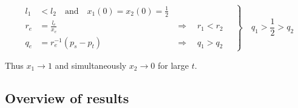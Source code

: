 \documentclass[	hyperref={pdfpagelabels=false}, xcolor=dvipsnames,
		11pt]{beamer}
\begin{document}
\begin{frame}
      \begin{equation}
	\left.\begin{aligned}
 	 l_1 & < l_2 \quad \text{and} \quad x_1(0)  = x_2(0) = \frac{1}{2} \\
        r_e & = \frac{l_e}{x_e}& \Rightarrow \quad r_1 < r_2 \quad \\
        q_e & = r_e^{-1} (p_s - p_t )& \Rightarrow \quad q_1 > q_2 \quad
       \end{aligned}
	\right\}
	\quad q_1 > \frac{1}{2} > q_2 \nonumber
       \end{equation}

      Thus $x_1 \to 1$ and simultaneously $x_2 \to 0$ for large $t$.






     

      

\end{frame}


\subsection{Overview of results}
\end{document}
